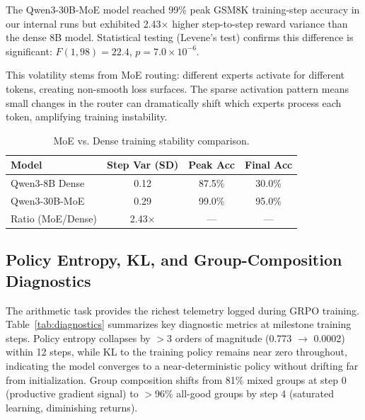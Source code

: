 \documentclass{article}
\begin{document}
The Qwen3-30B-MoE model reached 99\% peak GSM8K training-step accuracy in our internal runs but exhibited 2.43$\times$ higher step-to-step reward variance than the dense 8B model. Statistical testing (Levene's test) confirms this difference is significant: $F(1, 98) = 22.4$, $p = 7.0 \times 10^{-6}$.

This volatility stems from MoE routing: different experts activate for different tokens, creating non-smooth loss surfaces. The sparse activation pattern means small changes in the router can dramatically shift which experts process each token, amplifying training instability.

\begin{table}[htbp]
    \centering
    \caption{MoE vs. Dense training stability comparison.}
    \begin{tabular}{lccc}
        \toprule
        Model & Step Var (SD) & Peak Acc & Final Acc \\
        \midrule
        Qwen3-8B Dense & 0.12 & 87.5\% & 30.0\% \\
        Qwen3-30B-MoE & 0.29 & 99.0\% & 95.0\% \\
        Ratio (MoE/Dense) & 2.43$\times$ & --- & --- \\
        \bottomrule
    \end{tabular}
    \label{tab:moe_volatility}
\end{table}

\subsection{Policy Entropy, KL, and Group-Composition Diagnostics}
\label{sec:diagnostics_table}

The arithmetic task provides the richest telemetry logged during GRPO training. Table~\ref{tab:diagnostics} summarizes key diagnostic metrics at milestone training steps. Policy entropy collapses by $>$3 orders of magnitude (0.773 $\rightarrow$ 0.0002) within 12 steps, while KL to the training policy remains near zero throughout, indicating the model converges to a near-deterministic policy without drifting far from initialization. Group composition shifts from 81\% mixed groups at step 0 (productive gradient signal) to $>$96\% all-good groups by step 4 (saturated learning, diminishing returns).
\end{document}
